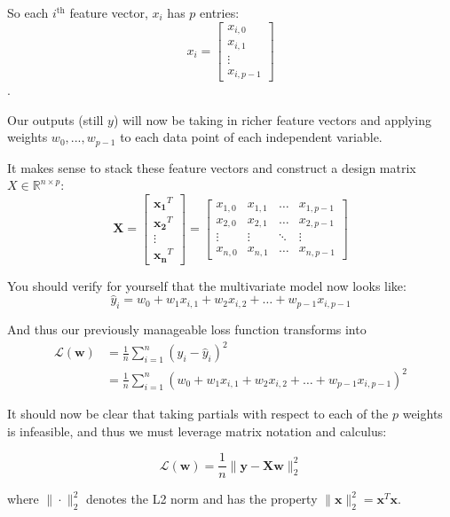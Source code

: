 \documentclass[12pt,dvipsnames,addpoints]{exam}
\renewcommand\vec{\mathbf}
\begin{document}
\begin{questions}
    So each $i^\text{th}$ feature vector, $x_i$ has $p$ entries: \[x_i = \begin{bmatrix}x_{i,0}\\x_{i,1}\\\vdots\\x_{i, p-1}\end{bmatrix}\].

        Our outputs (still $y$) will now be taking in richer feature vectors and applying weights $w_0, ..., w_{p-1}$ to each data point of each independent variable. 

        It makes sense to stack these feature vectors and construct a design matrix \mbox{$X\in\mathbb{R}^{n\times p}$}:
        \[\vec{X} = \begin{bmatrix}\vec{x_1}^T\\\vec{x_2}^T\\\vdots\\\vec{x_n}^T\end{bmatrix} = \begin{bmatrix}x_{1,0}&x_{1,1}&\dots&x_{1,p-1}\\x_{2,0}&x_{2,1}&\dots&x_{2,p-1}\\\vdots&\vdots&\ddots&\vdots\\x_{n,0}&x_{n,1}&\dots&x_{n,p-1}\end{bmatrix}\]

        You should verify for yourself that the multivariate model now looks like:
        \begin{equation}\label{eq:yi}\hat{y}_i = w_0 + w_1 x_{i,1} + w_2 x_{i,2} + \ldots + w_{p-1}x_{i,p-1}\end{equation}

        And thus our previously manageable loss function transforms into
        \begin{align}
            \mathcal{L}(\vec{w}) &= \frac{1}{n} \sum_{i=1}^n (y_i - \hat{y}_i)^2\\
                                 &= \frac{1}{n} \sum_{i=1}^n (w_0 + w_1 x_{i,1} + w_2 x_{i,2} + \ldots + w_{p-1}x_{i,p-1})^2
        \end{align}

        It should now be clear that taking partials with respect to each of the $p$ weights is infeasible, and thus we must leverage matrix notation and calculus:

        \[\mathcal{L}(\vec{w}) = \frac{1}{n} \|\vec{y}-\vec{X}\vec{w}\|_2^2\]

        where $\|\cdot\|_2^2$ denotes the L2 norm and has the property $\|\vec{x}\|^2_2 = \vec{x}^T \vec{x}$.


\end{questions}
\end{document}
